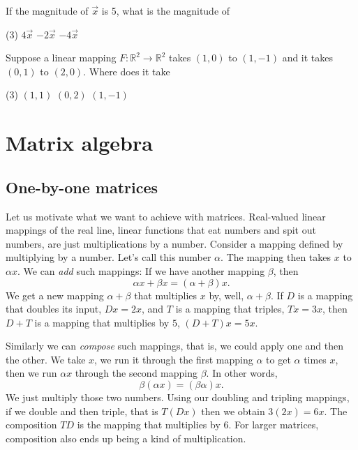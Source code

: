 \begin{exercise}
If the magnitude of $\vec{x}$ is 5, what is the magnitude of
\begin{tasks}(3)
\task
$4\vec{x}$
\task
$-2\vec{x}$
\task
$-4\vec{x}$
\end{tasks}
\end{exercise}

\begin{exercise}
Suppose a linear mapping $F \colon {\mathbb R}^2 \to {\mathbb R}^2$
takes $(1,0)$ to $(1,-1)$ and it takes $(0,1)$ to $(2,0)$. 
Where does it take
\begin{tasks}(3)
\task
$(1,1)$
\task
$(0,2)$
\task
$(1,-1)$
\end{tasks}
\end{exercise}


\sectionnewpage
\section{Matrix algebra}
\label{matalg:section}



\subsection{One-by-one matrices}

Let us motivate what we want to achieve with matrices.
Real-valued linear mappings of the real line, linear functions
that eat numbers and spit out numbers, are just multiplications by a
number.  Consider a mapping defined by multiplying by a
number.  Let's call this number $\alpha$.   The mapping then takes $x$ to
$\alpha x$.  We can
\emph{add} such mappings:
If we have another mapping $\beta$, then
\begin{equation*}
\alpha x + \beta x = (\alpha + \beta) x .
\end{equation*}
We get a new mapping $\alpha+\beta$ that multiplies $x$ by, well,
$\alpha+\beta$.  If $D$ is a mapping that doubles its input, 
$Dx = 2x$, and $T$ is a mapping that triples, $Tx = 3x$, then
$D+T$ is a mapping that multiplies by $5$, $(D+T)x = 5x$.

Similarly we can \emph{compose} such mappings, that
is, we could apply one and then the other.  We take $x$, we run it through
the first mapping $\alpha$ to get $\alpha$ times $x$, then we run
$\alpha x$ through the second mapping $\beta$.  In other words,
\begin{equation*}
\beta ( \alpha x ) = (\beta \alpha) x .
\end{equation*}
We just multiply those two numbers.  Using our doubling
and tripling mappings, if we double and then triple, that is $T(Dx)$ then
we obtain $3(2x) = 6x$.  The composition $TD$ is the mapping that multiplies
by $6$.  For larger matrices, composition also ends up being a kind of
multiplication.

